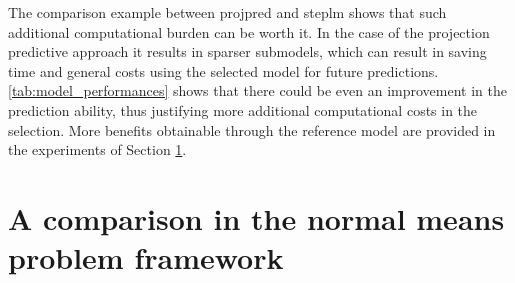 \documentclass[american,]{article}
\theoremstyle{definition}
\begin{document}
The comparison example between projpred and steplm shows that such additional computational burden can be worth it. In the case of the projection predictive approach it results in sparser submodels, which can result in saving time and general costs using the selected model for future predictions. \ref{tab:model_performances} shows that there could be even an improvement in the prediction ability, thus justifying more additional computational costs in the selection. More benefits obtainable through the reference model are provided in the experiments of Section \ref{comparison}.


\hypertarget{comparison}{%
\section{A comparison in the normal means problem framework}\label{comparison}}
\end{document}
